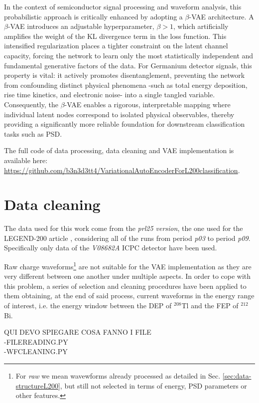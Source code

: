 In the context of semiconductor signal processing and waveform analysis, this probabilistic approach is critically enhanced by adopting a $\beta$-VAE architecture. A $\beta$-VAE introduces an adjustable hyperparameter, $\beta > 1$, which artificially amplifies the weight of the KL divergence term in the loss function. This intensified regularization places a tighter constraint on the latent channel capacity, forcing the network to learn only the most statistically independent and fundamental generative factors of the data. For Germanium detector signals, this property is vital: it actively promotes disentanglement, preventing the network from confounding distinct physical phenomena -such as total energy deposition, rise time kinetics, and electronic noise- into a single tangled variable. Consequently, the $\beta$-VAE enables a rigorous, interpretable mapping where individual latent nodes correspond to isolated physical observables, thereby providing a significantly more reliable foundation for downstream classification tasks such as \ac{PSD}.

The full code of data processing, data cleaning and \ac{VAE} implementation is available here: \url{https://github.com/b3n3d3tt4/VariationalAutoEncoderForL200classification}. 

\section{Data cleaning}
\label{sec:data-cleaning}
The data used for this work come from the \textit{prl25 version}, the one used for the LEGEND-200 article \cite{L200-sep25}, considering all of the runs from period \textit{p03} to period \textit{p09}. Specifically only data of the \textit{V08682A} ICPC detector have been used.

Raw charge waveforms\footnote{For \textit{raw} we mean wavewforms already processed as detailed in Sec. \ref{sec:data-structureL200}, but still not selected in terms of energy, \ac{PSD} parameters or other features.} are not suitable for the \ac{VAE} implementation as they are very different between one another under multiple aspects. In order to cope with this problem, a series of selection and cleaning procedures have been applied to them obtaining, at the end of said process, current waveforms in the energy range of interest, i.e. the energy window between the \ac{DEP} of ${}^{208}$Tl and the \ac{FEP} of ${}^{212}$Bi. 

QUI DEVO SPIEGARE COSA FANNO I FILE \\
-FILEREADING.PY \\
-WFCLEANING.PY

